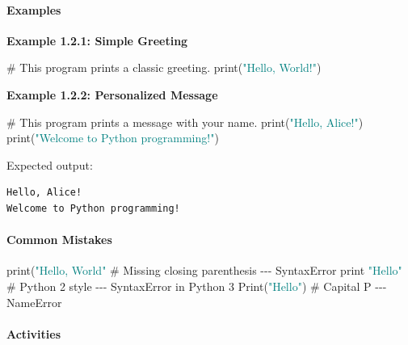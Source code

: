 \documentclass[
  justified,
  openright,
]{tufte-book}
\let\subsubsection\paragraph
\let\paragraph\paragraph
\newcommand{\BuiltInTok}[1]{#1}
\newcommand{\CommentTok}[1]{\textcolor{MidGray}{#1}}
\newcommand{\NormalTok}[1]{#1}
\newcommand{\StringTok}[1]{\textcolor{Teal}{#1}}
\newenvironment{Shaded}{%
  \begin{snugshade}
}{%
  \end{snugshade}
}
\let\subsubsection\paragraph
\let\paragraph\paragraph
\begin{document}
\subsubsection{Examples}\label{examples}

\textbf{Example 1.2.1: Simple Greeting}

\begin{Shaded}
\begin{Highlighting}[]
\CommentTok{\# This program prints a classic greeting.}
\BuiltInTok{print}\NormalTok{(}\StringTok{"Hello, World!"}\NormalTok{)}
\end{Highlighting}
\end{Shaded}

\textbf{Example 1.2.2: Personalized Message}

\begin{Shaded}
\begin{Highlighting}[]
\CommentTok{\# This program prints a message with your name.}
\BuiltInTok{print}\NormalTok{(}\StringTok{"Hello, Alice!"}\NormalTok{)}
\BuiltInTok{print}\NormalTok{(}\StringTok{"Welcome to Python programming!"}\NormalTok{)}
\end{Highlighting}
\end{Shaded}

Expected output:

\begin{verbatim}
Hello, Alice!
Welcome to Python programming!
\end{verbatim}

\subsubsection{Common Mistakes}\label{common-mistakes}

\begin{Shaded}
\begin{Highlighting}[]
\BuiltInTok{print}\NormalTok{(}\StringTok{"Hello, World"}        \CommentTok{\# Missing closing parenthesis {-}{-}{-} SyntaxError}
\BuiltInTok{print} \StringTok{"Hello"}               \CommentTok{\# Python 2 style {-}{-}{-} SyntaxError in Python 3}
\NormalTok{Print(}\StringTok{"Hello"}\NormalTok{)              }\CommentTok{\# Capital P {-}{-}{-} NameError}
\end{Highlighting}
\end{Shaded}

\subsubsection{Activities}\label{activities-1}
\end{document}
